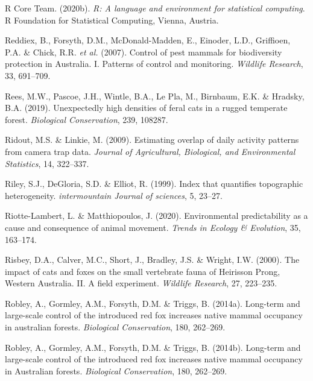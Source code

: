 \documentclass[11pt,a4paper,titlepage,twoside,openright]{style/unimelbthesis}
\begin{document}
\begin{mainmatter}
\leavevmode\hypertarget{ref-R}{}%
R Core Team. (2020b). \emph{R: A language and environment for statistical computing}. R Foundation for Statistical Computing, Vienna, Austria.

\leavevmode\hypertarget{ref-reddiex2007control}{}%
Reddiex, B., Forsyth, D.M., McDonald-Madden, E., Einoder, L.D., Griffioen, P.A. \& Chick, R.R. \emph{et al.} (2007). Control of pest mammals for biodiversity protection in Australia. I. Patterns of control and monitoring. \emph{Wildlife Research}, 33, 691--709.

\leavevmode\hypertarget{ref-rees2019unexpectedly}{}%
Rees, M.W., Pascoe, J.H., Wintle, B.A., Le Pla, M., Birnbaum, E.K. \& Hradsky, B.A. (2019). Unexpectedly high densities of feral cats in a rugged temperate forest. \emph{Biological Conservation}, 239, 108287.

\leavevmode\hypertarget{ref-ridout2009estimating}{}%
Ridout, M.S. \& Linkie, M. (2009). Estimating overlap of daily activity patterns from camera trap data. \emph{Journal of Agricultural, Biological, and Environmental Statistics}, 14, 322--337.

\leavevmode\hypertarget{ref-riley1999index}{}%
Riley, S.J., DeGloria, S.D. \& Elliot, R. (1999). Index that quantifies topographic heterogeneity. \emph{intermountain Journal of sciences}, 5, 23--27.

\leavevmode\hypertarget{ref-riotte-lambert2020environmental}{}%
Riotte-Lambert, L. \& Matthiopoulos, J. (2020). Environmental predictability as a cause and consequence of animal movement. \emph{Trends in Ecology \& Evolution}, 35, 163--174.

\leavevmode\hypertarget{ref-risbey2000impacts}{}%
Risbey, D.A., Calver, M.C., Short, J., Bradley, J.S. \& Wright, I.W. (2000). The impact of cats and foxes on the small vertebrate fauna of Heirisson Prong, Western Australia. II. A field experiment. \emph{Wildlife Research}, 27, 223--235.

\leavevmode\hypertarget{ref-ROBLEY2014262}{}%
Robley, A., Gormley, A.M., Forsyth, D.M. \& Triggs, B. (2014a). Long-term and large-scale control of the introduced red fox increases native mammal occupancy in australian forests. \emph{Biological Conservation}, 180, 262--269.

\leavevmode\hypertarget{ref-robley2014long}{}%
Robley, A., Gormley, A.M., Forsyth, D.M. \& Triggs, B. (2014b). Long-term and large-scale control of the introduced red fox increases native mammal occupancy in Australian forests. \emph{Biological Conservation}, 180, 262--269.


\end{mainmatter}
\end{document}
